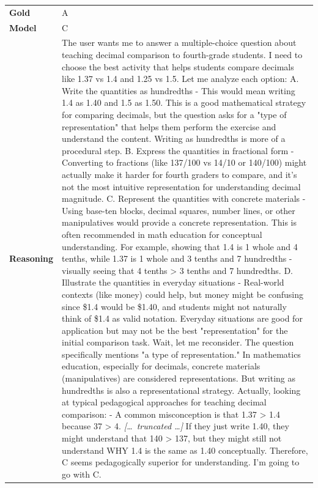 \begin{longtable}{@{}l p{13cm}@{}}
  \textbf{Gold}      & A       \\
  \textbf{Model}     & C  \\
  \textbf{Reasoning} & The user wants me to answer a multiple-choice question about teaching decimal comparison to fourth-grade students. I need to choose the best activity that helps students compare decimals like 1.37 vs 1.4 and 1.25 vs 1.5. \newline Let me analyze each option: \newline A. Write the quantities as hundredths - This would mean writing 1.4 as 1.40 and 1.5 as 1.50. This is a good mathematical strategy for comparing decimals, but the question asks for a "type of representation" that helps them perform the exercise and understand the content. Writing as hundredths is more of a procedural step. \newline B. Express the quantities in fractional form - Converting to fractions (like 137/100 vs 14/10 or 140/100) might actually make it harder for fourth graders to compare, and it's not the most intuitive representation for understanding decimal magnitude. \newline C. Represent the quantities with concrete materials - Using base-ten blocks, decimal squares, number lines, or other manipulatives would provide a concrete representation. This is often recommended in math education for conceptual understanding. For example, showing that 1.4 is 1 whole and 4 tenths, while 1.37 is 1 whole and 3 tenths and 7 hundredths - visually seeing that 4 tenths \textgreater{} 3 tenths and 7 hundredths. \newline D. Illustrate the quantities in everyday situations - Real-world contexts (like money) could help, but money might be confusing since \$1.4 would be \$1.40, and students might not naturally think of \$1.4 as valid notation. Everyday situations are good for application but may not be the best "representation" for the initial comparison task. \newline Wait, let me reconsider. The question specifically mentions "a type of representation." In mathematics education, especially for decimals, concrete materials (manipulatives) are considered representations. But writing as hundredths is also a representational strategy. \newline Actually, looking at typical pedagogical approaches for teaching decimal comparison: \newline - A common misconception is that 1.37 \textgreater{} 1.4 because 37 \textgreater{} 4. \newline \textit{[\ldots\ truncated \ldots]} \newline If they just write 1.40, they might understand that 140 \textgreater{} 137, but they might still not understand WHY 1.4 is the same as 1.40 conceptually. \newline Therefore, C seems pedagogically superior for understanding. \newline I'm going to go with C.  \\

\end{longtable}
